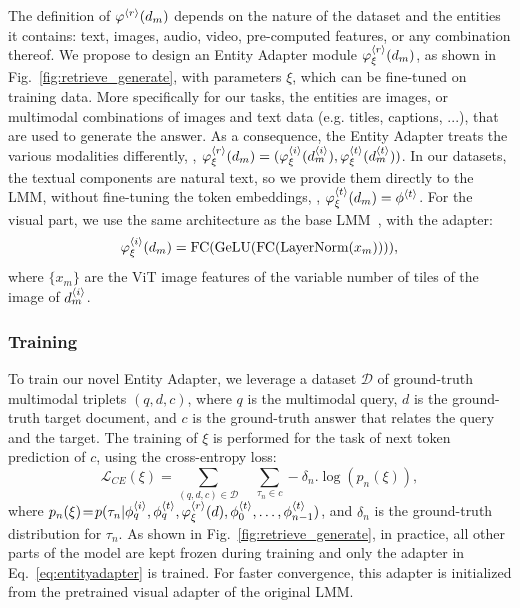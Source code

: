The definition of $\varphi^{{\langle r\rangle}}(d_m)$ depends on the nature of the dataset and the entities it contains: text, images, audio, video, pre-computed features, or any combination thereof.
%
We propose to design an Entity Adapter module $\varphi^{{\langle r\rangle}}_{\xi}(d_m)$, as shown in Fig.~\ref{fig:retrieve_generate}, with parameters $\xi$, which can be fine-tuned on training data.
More specifically for our \tasknameshort tasks, the entities are images, or multimodal combinations of images and text data (e.g. titles, captions, ...), that are used to generate the answer.
As a consequence, the Entity Adapter treats the various modalities differently, \ie, $\varphi^{{\langle r\rangle}}_{\xi}(d_m) = (\varphi^{{\langle i\rangle}}_{\xi}(d^{{\langle i\rangle}}_m), \varphi^{{\langle t\rangle}}_{\xi}(d^{{\langle t\rangle}}_m))$.
In our datasets, the textual components are natural text, so we provide them directly to the LMM, without fine-tuning the token embeddings, \ie, $\varphi^{{\langle t\rangle}}_{\xi}(d_m)=\phi^{{\langle t\rangle}}$.
%
%
%
%
%
%
For the visual part, we use the same architecture as the base LMM~\cite{chen2024internvl}, with the adapter:
\begin{equation}
\varphi^{{\langle i\rangle}}_{\xi}(d_m)=\text{FC}(\text{GeLU}(\text{FC}(\text{LayerNorm}(x_m)))), \label{eq:entityadapter}
\end{equation}
where $\{x_m\}$ are the ViT image features of the variable number of tiles of the image of $d^{{\langle i\rangle}}_m$.

\subsubsection{Training}
To train our novel Entity Adapter, we leverage a dataset $\mathcal{D}$ of ground-truth multimodal triplets $(q, d, c)$, where $q$ is the multimodal query, $d$ is the ground-truth target document, and $c$ is the ground-truth answer that relates the query and the target.
The training of $\xi$ is performed for the task of next token prediction of $c$, using the cross-entropy loss:
%
\begin{equation}
\mathcal{L}_{CE}(\xi) = \sum_{(q, d, c)\in\mathcal{D}} \quad
\sum_{\tau_n\in c} -\delta_n.\log(p_n(\xi)),
\end{equation}
where $p_n(\xi)\!=\!p(\tau_n | \phi^{{\langle i\rangle}}_q, \phi^{{\langle t\rangle}}_q, \nonumber \varphi^{{\langle r\rangle}}_{\xi}(d), \phi^{{\langle t\rangle}}_0, \ldots, \phi^{{\langle t\rangle}}_{n-1})$,
and $\delta_n$ is the ground-truth distribution for $\tau_n$.
%
%
As shown in Fig.~\ref{fig:retrieve_generate}, in practice, all other parts of the model  are kept frozen during training and only the adapter in Eq.~\ref{eq:entityadapter} is trained. 
For faster convergence, this adapter is initialized from the pretrained visual adapter of the original LMM.

